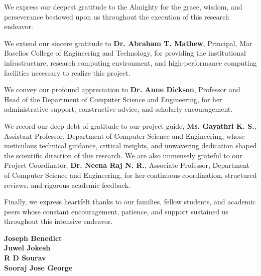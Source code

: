 \documentclass[12pt,a4paper]{report}
\begin{document}
\vspace{0.6cm}

\noindent We express our deepest gratitude to the Almighty for the grace, wisdom, and perseverance bestowed upon us throughout the execution of this research endeavor.

\vspace{0.3cm}

\noindent We extend our sincere gratitude to \textbf{Dr. Abraham T. Mathew}, Principal, Mar Baselios College of Engineering and Technology, for providing the institutional infrastructure, research computing environment, and high-performance computing facilities necessary to realize this project.

\vspace{0.3cm}

\noindent We convey our profound appreciation to \textbf{Dr. Anne Dickson}, Professor and Head of the Department of Computer Science and Engineering, for her administrative support, constructive advice, and scholarly encouragement.

\vspace{0.3cm}

\noindent We record our deep debt of gratitude to our project guide, \textbf{Ms. Gayathri K. S.}, Assistant Professor, Department of Computer Science and Engineering, whose meticulous technical guidance, critical insights, and unwavering dedication shaped the scientific direction of this research. We are also immensely grateful to our Project Coordinator, \textbf{Dr. Neena Raj N. R.}, Associate Professor, Department of Computer Science and Engineering, for her continuous coordination, structured reviews, and rigorous academic feedback.

\vspace{0.3cm}

\noindent Finally, we express heartfelt thanks to our families, fellow students, and academic peers whose constant encouragement, patience, and support sustained us throughout this intensive endeavor.

\vspace{1.0cm}
\noindent
\textbf{Joseph Benedict}\\
\textbf{Juwel Jokesh}\\
\textbf{R D Sourav}\\
\textbf{Sooraj Jose George}

\end{document}
